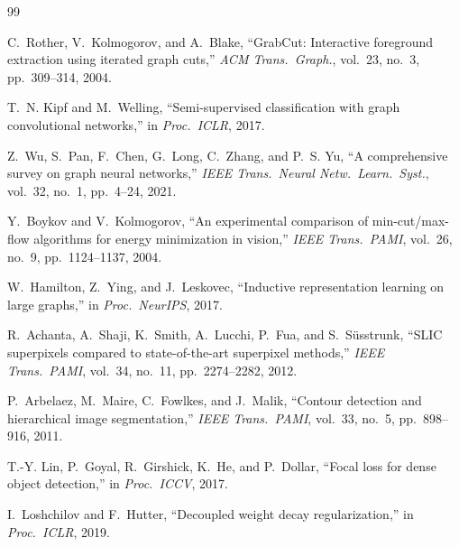 \documentclass[11pt]{article}
\begin{document}
\begin{thebibliography}{99}

C.~Rother, V.~Kolmogorov, and A.~Blake,
``GrabCut: Interactive foreground extraction using iterated graph cuts,''
\emph{ACM Trans.\ Graph.}, vol.~23, no.~3, pp.~309--314, 2004.

T.~N. Kipf and M.~Welling,
``Semi-supervised classification with graph convolutional networks,''
in \emph{Proc.\ ICLR}, 2017.

Z.~Wu, S.~Pan, F.~Chen, G.~Long, C.~Zhang, and P.~S. Yu,
``A comprehensive survey on graph neural networks,''
\emph{IEEE Trans.\ Neural Netw.\ Learn.\ Syst.}, vol.~32, no.~1, pp.~4--24, 2021.

Y.~Boykov and V.~Kolmogorov,
``An experimental comparison of min-cut/max-flow algorithms for energy minimization in vision,''
\emph{IEEE Trans.\ PAMI}, vol.~26, no.~9, pp.~1124--1137, 2004.

W.~Hamilton, Z.~Ying, and J.~Leskovec,
``Inductive representation learning on large graphs,''
in \emph{Proc.\ NeurIPS}, 2017.

R.~Achanta, A.~Shaji, K.~Smith, A.~Lucchi, P.~Fua, and S.~S\"{u}sstrunk,
``SLIC superpixels compared to state-of-the-art superpixel methods,''
\emph{IEEE Trans.\ PAMI}, vol.~34, no.~11, pp.~2274--2282, 2012.

P.~Arbelaez, M.~Maire, C.~Fowlkes, and J.~Malik,
``Contour detection and hierarchical image segmentation,''
\emph{IEEE Trans.\ PAMI}, vol.~33, no.~5, pp.~898--916, 2011.

T.-Y. Lin, P.~Goyal, R.~Girshick, K.~He, and P.~Dollar,
``Focal loss for dense object detection,''
in \emph{Proc.\ ICCV}, 2017.

I.~Loshchilov and F.~Hutter,
``Decoupled weight decay regularization,''
in \emph{Proc.\ ICLR}, 2019.

\end{thebibliography}
\end{document}

